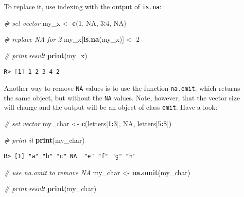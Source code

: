 \documentclass[
  12pt,
]{book}
\newenvironment{Shaded}{\begin{snugshade}}{\end{snugshade}}
\newcommand{\CommentTok}[1]{\textcolor[rgb]{0.37,0.37,0.37}{\textit{#1}}}
\newcommand{\DecValTok}[1]{\textcolor[rgb]{0.06,0.06,0.06}{#1}}
\newcommand{\KeywordTok}[1]{\textcolor[rgb]{0.27,0.27,0.27}{\textbf{#1}}}
\newcommand{\NormalTok}[1]{#1}
\newcommand{\OperatorTok}[1]{\textcolor[rgb]{0.43,0.43,0.43}{\textbf{#1}}}
\newcommand{\OtherTok}[1]{\textcolor[rgb]{0.37,0.37,0.37}{#1}}
\newcommand{\StringTok}[1]{\textcolor[rgb]{0.5,0.5,0.5}{#1}}
\begin{document}
To replace it, use indexing with the output of \texttt{is.na}:

\begin{Shaded}
\begin{Highlighting}[]
\CommentTok{# set vector}
\NormalTok{my_x <-}\StringTok{ }\KeywordTok{c}\NormalTok{(}\DecValTok{1}\NormalTok{, }\OtherTok{NA}\NormalTok{, }\DecValTok{3}\OperatorTok{:}\DecValTok{4}\NormalTok{, }\OtherTok{NA}\NormalTok{)}

\CommentTok{# replace NA for 2}
\NormalTok{my_x[}\KeywordTok{is.na}\NormalTok{(my_x)] <-}\StringTok{ }\DecValTok{2}

\CommentTok{# print result}
\KeywordTok{print}\NormalTok{(my_x)}
\end{Highlighting}
\end{Shaded}

\begin{verbatim}
R> [1] 1 2 3 4 2
\end{verbatim}

Another way to remove \texttt{NA} values is to use the function \texttt{na.omit}. which returns the same object, but without the \texttt{NA} values. Note, however, that the vector size will change and the output will be an object of class \texttt{omit}. Have a look:  

\begin{Shaded}
\begin{Highlighting}[]
\CommentTok{# set vector}
\NormalTok{my_char <-}\StringTok{ }\KeywordTok{c}\NormalTok{(letters[}\DecValTok{1}\OperatorTok{:}\DecValTok{3}\NormalTok{], }\OtherTok{NA}\NormalTok{, letters[}\DecValTok{5}\OperatorTok{:}\DecValTok{8}\NormalTok{])}

\CommentTok{# print it}
\KeywordTok{print}\NormalTok{(my_char)}
\end{Highlighting}
\end{Shaded}

\begin{verbatim}
R> [1] "a" "b" "c" NA  "e" "f" "g" "h"
\end{verbatim}

\begin{Shaded}
\begin{Highlighting}[]
\CommentTok{# use na.omit to remove NA}
\NormalTok{my_char <-}\StringTok{ }\KeywordTok{na.omit}\NormalTok{(my_char)}

\CommentTok{# print result}
\KeywordTok{print}\NormalTok{(my_char)}
\end{Highlighting}
\end{Shaded}
\end{document}
